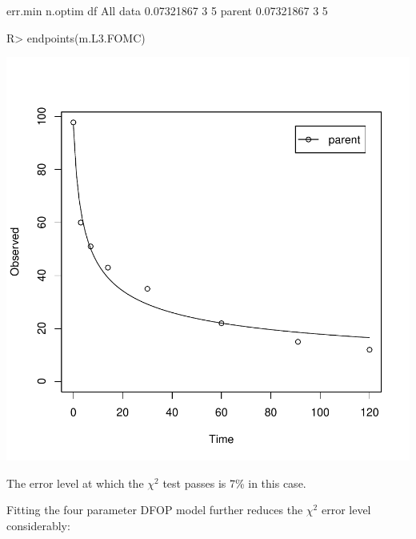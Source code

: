 \documentclass[12pt,a4paper]{article}
\begin{document}
\begin{Schunk}
\begin{Soutput}
            err.min n.optim df
All data 0.07321867       3  5
parent   0.07321867       3  5
\end{Soutput}
\begin{Sinput}
R> endpoints(m.L3.FOMC)
\end{Sinput}
\end{Schunk}
\includegraphics{examples-L3_FOMC}

The error level at which the $\chi^2$ test passes is 7\% in this case.

Fitting the four parameter DFOP model further reduces the $\chi^2$ error level
considerably:
\end{document}
